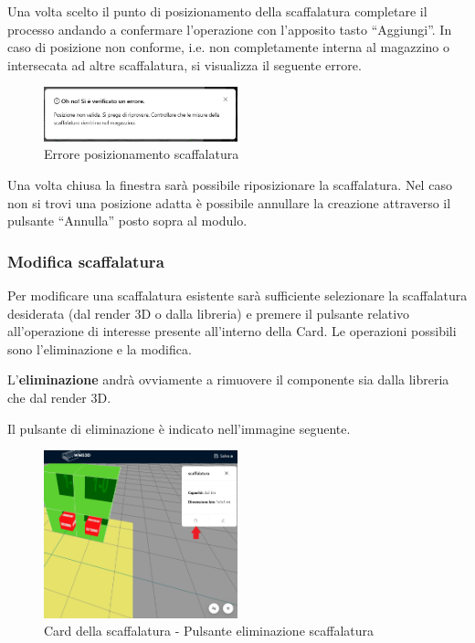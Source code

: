             \noindent Una volta scelto il punto di posizionamento della scaffalatura completare il processo andando a confermare l'operazione con l'apposito tasto ``Aggiungi''. 
            In caso di posizione non conforme, i.e. non completamente interna al magazzino o intersecata ad altre scaffalatura, si visualizza il seguente errore. 
             \begin{figure}[H]
                \centering
                \includegraphics[width=0.5\textwidth]{images/errore_posizionamento.png}
                \caption{Errore posizionamento scaffalatura}
            \end{figure}
            \noindent Una volta chiusa la finestra sarà possibile riposizionare la scaffalatura. Nel caso non si trovi una posizione adatta è possibile annullare la creazione attraverso il pulsante ``Annulla'' posto sopra al modulo.


        \subsubsection{Modifica scaffalatura}\label{sec:scaffalature:modifica}
            Per modificare una scaffalatura esistente sarà sufficiente selezionare la scaffalatura desiderata (dal render 3D o dalla libreria) e premere il pulsante relativo all'operazione di interesse presente all'interno della Card. Le operazioni possibili sono l'eliminazione e la modifica.

            \bigskip
            \noindent L'\textbf{eliminazione} andrà ovviamente a rimuovere il componente sia dalla libreria che dal render 3D. 
            
            \noindent Il pulsante di eliminazione è indicato nell'immagine seguente.
            \begin{figure}[H]
                \centering
                \includegraphics[width=0.5\textwidth]{images/pulsante_elimina_scaff.png}
                \caption{Card della scaffalatura - Pulsante eliminazione scaffalatura}
            \end{figure}

